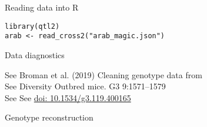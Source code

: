 \documentclass[12pt,t,aspectratio=169]{beamer}
\begin{document}
\begin{frame}[fragile,c]{Reading data into R}


\begin{center} \begin{minipage}[c]{11.7cm} \begin{semiverbatim}
\lstset{basicstyle=\large}
\begin{lstlisting}[linewidth=11.7cm]
library(qtl2)
arab <- read_cross2("arab_magic.json")
\end{lstlisting}
\end{semiverbatim} \end{minipage} \end{center}



\end{frame}


\begin{frame}[c]{Data diagnostics}


\hfill \begin{minipage}{11.7cm}
{\lolit See} Broman et al. (2019) Cleaning genotype data from \\
{\color{background} See} Diversity Outbred mice. G3 9:1571--1579 \\[12pt]
{\color{background} See See} \href{https://doi.org/10.1534/g3.119.400165}{doi: 10.1534/g3.119.400165}
\end{minipage}

\end{frame}



\begin{frame}[c]{Genotype reconstruction}



\end{frame}
\end{document}
